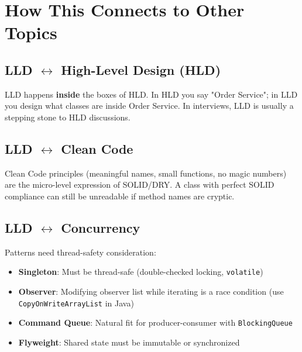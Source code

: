 \documentclass[11pt]{article}
\providecommand{\tightlist}{\setlength{\itemsep}{1pt}\setlength{\parskip}{0pt}}
\begin{document}
\section{How This Connects to Other Topics}\label{how-this-connects-to-other-topics}

\subsection{\texorpdfstring{LLD \(\leftrightarrow\) High-Level Design (HLD)}{LLD \textbackslash leftrightarrow High-Level Design (HLD)}}\label{lld-leftrightarrow-high-level-design-hld}

LLD happens \textbf{inside} the boxes of HLD. In HLD you say "Order Service"; in LLD you design what classes are inside Order Service. In interviews, LLD is usually a stepping stone to HLD discussions.

\subsection{\texorpdfstring{LLD \(\leftrightarrow\) Clean Code}{LLD \textbackslash leftrightarrow Clean Code}}\label{lld-leftrightarrow-clean-code}

Clean Code principles (meaningful names, small functions, no magic numbers) are the micro-level expression of SOLID/DRY. A class with perfect SOLID compliance can still be unreadable if method names are cryptic.

\subsection{\texorpdfstring{LLD \(\leftrightarrow\) Concurrency}{LLD \textbackslash leftrightarrow Concurrency}}\label{lld-leftrightarrow-concurrency}

Patterns need thread-safety consideration:

\begin{itemize}
\tightlist
\item
  \textbf{Singleton}: Must be thread-safe (double-checked locking, \texttt{volatile})
\item
  \textbf{Observer}: Modifying observer list while iterating is a race condition (use \texttt{CopyOnWriteArrayList} in Java)
\item
  \textbf{Command Queue}: Natural fit for producer-consumer with \texttt{BlockingQueue}
\item
  \textbf{Flyweight}: Shared state must be immutable or synchronized
\end{itemize}
\end{document}
